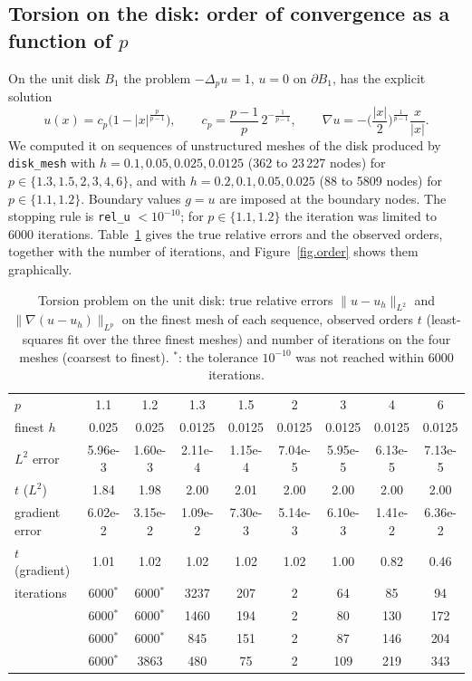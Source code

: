 \documentclass[11pt]{amsart}
\theoremstyle{definition}
\theoremstyle{remark}
\numberwithin{equation}{section}
\begin{document}
\subsection{Torsion on the disk: order of convergence as a function of \texorpdfstring{$p$}{p}}\label{sec.torsion}
On the unit disk $B_1$ the problem $-\Delta_pu=1$, $u=0$ on $\partial B_1$, has the explicit solution
\begin{equation}\label{eq.torsion}
u(x)=c_p\big(1-|x|^{\frac p{p-1}}\big),\qquad c_p=\frac{p-1}p\,2^{-\frac1{p-1}},\qquad \nabla u=-\Big(\frac{|x|}2\Big)^{\frac1{p-1}}\frac{x}{|x|}.
\end{equation}
We computed it on sequences of unstructured meshes of the disk produced by \texttt{disk\_mesh} with $h=0.1,0.05,0.025,0.0125$ (362 to 23\,227 nodes) for $p\in\{1.3,1.5,2,3,4,6\}$, and with $h=0.2,0.1,0.05,0.025$ (88 to 5809 nodes) for $p\in\{1.1,1.2\}$. Boundary values $g=u$ are imposed at the boundary nodes. The stopping rule is \texttt{rel\_u} $<10^{-10}$; for $p\in\{1.1,1.2\}$ the iteration was limited to $6000$ iterations. Table~\ref{tab.order} gives the true relative errors and the observed orders, together with the number of iterations, and Figure~\ref{fig.order} shows them graphically.

\begin{table}[ht]
\centering
\caption{Torsion problem on the unit disk: true relative errors $\|u-u_h\|_{L^2}$ and $\|\nabla(u-u_h)\|_{L^p}$ on the finest mesh of each sequence, observed orders $t$ (least-squares fit over the three finest meshes) and number of iterations on the four meshes (coarsest to finest). $^*$: the tolerance $10^{-10}$ was not reached within $6000$ iterations.}\label{tab.order}
\small
\setlength{\tabcolsep}{3.5pt}
\begin{tabular}{lcccccccc}
\toprule
$p$ & 1.1 & 1.2 & 1.3 & 1.5 & 2 & 3 & 4 & 6\\
finest $h$ & 0.025 & 0.025 & 0.0125 & 0.0125 & 0.0125 & 0.0125 & 0.0125 & 0.0125\\
\midrule
$L^2$ error & 5.96e-3 & 1.60e-3 & 2.11e-4 & 1.15e-4 & 7.04e-5 & 5.95e-5 & 6.13e-5 & 7.13e-5\\
$t$ ($L^2$) & 1.84 & 1.98 & 2.00 & 2.01 & 2.00 & 2.00 & 2.00 & 2.00\\
gradient error & 6.02e-2 & 3.15e-2 & 1.09e-2 & 7.30e-3 & 5.14e-3 & 6.10e-3 & 1.41e-2 & 6.36e-2\\
$t$ (gradient) & 1.01 & 1.02 & 1.02 & 1.02 & 1.02 & 1.00 & 0.82 & 0.46\\
\midrule
iterations & 6000$^*$ & 6000$^*$ & 3237 & 207 & 2 & 64 & 85 & 94\\
 & 6000$^*$ & 6000$^*$ & 1460 & 194 & 2 & 80 & 130 & 172\\
 & 6000$^*$ & 6000$^*$ & 845 & 151 & 2 & 87 & 146 & 204\\
 & 6000$^*$ & 3863 & 480 & 75 & 2 & 109 & 219 & 343\\
\bottomrule
\end{tabular}
\end{table}
\end{document}
